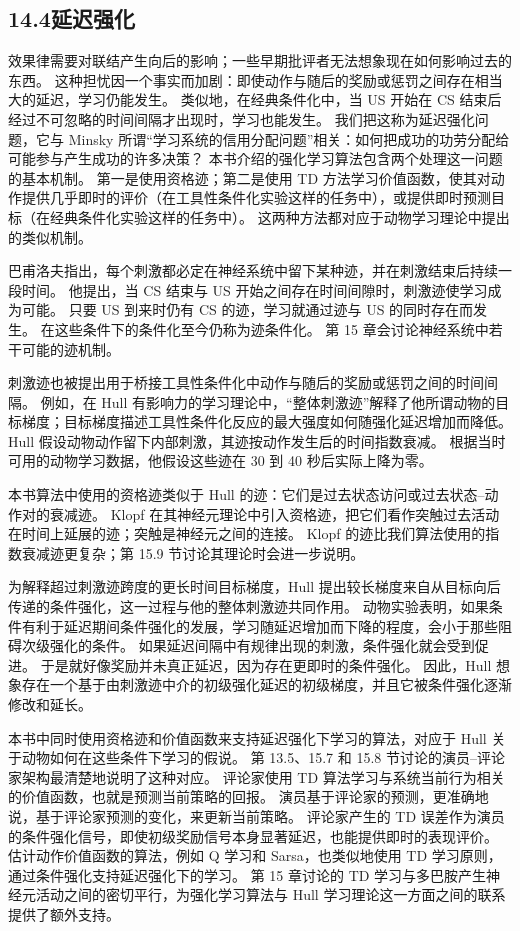 \documentclass[UTF8, 12pt, fontset=fandol, oneside]{ctexart}
\begin{document}
\subsection*{14.4\quad 延迟强化}

效果律需要对联结产生向后的影响；一些早期批评者无法想象现在如何影响过去的东西。
这种担忧因一个事实而加剧：即使动作与随后的奖励或惩罚之间存在相当大的延迟，学习仍能发生。
类似地，在经典条件化中，当 US 开始在 CS 结束后经过不可忽略的时间间隔才出现时，学习也能发生。
我们把这称为延迟强化问题，它与 Minsky 所谓“学习系统的信用分配问题”相关：如何把成功的功劳分配给可能参与产生成功的许多决策？
本书介绍的强化学习算法包含两个处理这一问题的基本机制。
第一是使用资格迹；第二是使用 TD 方法学习价值函数，使其对动作提供几乎即时的评价（在工具性条件化实验这样的任务中），或提供即时预测目标（在经典条件化实验这样的任务中）。
这两种方法都对应于动物学习理论中提出的类似机制。

巴甫洛夫指出，每个刺激都必定在神经系统中留下某种迹，并在刺激结束后持续一段时间。
他提出，当 CS 结束与 US 开始之间存在时间间隙时，刺激迹使学习成为可能。
只要 US 到来时仍有 CS 的迹，学习就通过迹与 US 的同时存在而发生。
在这些条件下的条件化至今仍称为迹条件化。
第 15 章会讨论神经系统中若干可能的迹机制。

刺激迹也被提出用于桥接工具性条件化中动作与随后的奖励或惩罚之间的时间间隔。
例如，在 Hull 有影响力的学习理论中，“整体刺激迹”解释了他所谓动物的目标梯度；目标梯度描述工具性条件化反应的最大强度如何随强化延迟增加而降低。
Hull 假设动物动作留下内部刺激，其迹按动作发生后的时间指数衰减。
根据当时可用的动物学习数据，他假设这些迹在 30 到 40 秒后实际上降为零。

本书算法中使用的资格迹类似于 Hull 的迹：它们是过去状态访问或过去状态--动作对的衰减迹。
Klopf 在其神经元理论中引入资格迹，把它们看作突触过去活动在时间上延展的迹；突触是神经元之间的连接。
Klopf 的迹比我们算法使用的指数衰减迹更复杂；第 15.9 节讨论其理论时会进一步说明。

为解释超过刺激迹跨度的更长时间目标梯度，Hull 提出较长梯度来自从目标向后传递的条件强化，这一过程与他的整体刺激迹共同作用。
动物实验表明，如果条件有利于延迟期间条件强化的发展，学习随延迟增加而下降的程度，会小于那些阻碍次级强化的条件。
如果延迟间隔中有规律出现的刺激，条件强化就会受到促进。
于是就好像奖励并未真正延迟，因为存在更即时的条件强化。
因此，Hull 想象存在一个基于由刺激迹中介的初级强化延迟的初级梯度，并且它被条件强化逐渐修改和延长。

本书中同时使用资格迹和价值函数来支持延迟强化下学习的算法，对应于 Hull 关于动物如何在这些条件下学习的假说。
第 13.5、15.7 和 15.8 节讨论的演员--评论家架构最清楚地说明了这种对应。
评论家使用 TD 算法学习与系统当前行为相关的价值函数，也就是预测当前策略的回报。
演员基于评论家的预测，更准确地说，基于评论家预测的变化，来更新当前策略。
评论家产生的 TD 误差作为演员的条件强化信号，即使初级奖励信号本身显著延迟，也能提供即时的表现评价。
估计动作价值函数的算法，例如 Q 学习和 Sarsa，也类似地使用 TD 学习原则，通过条件强化支持延迟强化下的学习。
第 15 章讨论的 TD 学习与多巴胺产生神经元活动之间的密切平行，为强化学习算法与 Hull 学习理论这一方面之间的联系提供了额外支持。
\end{document}
